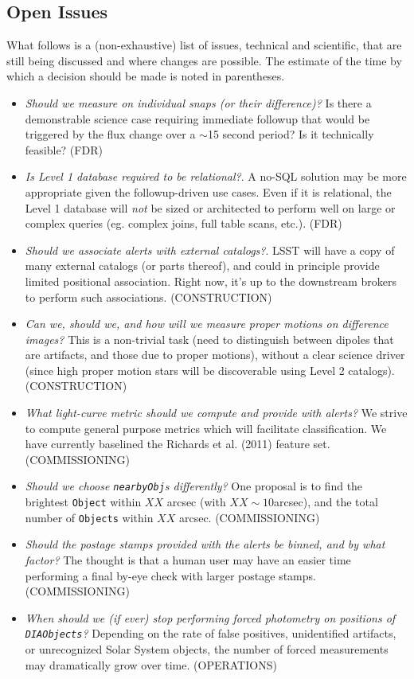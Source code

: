 \documentclass[12pt]{article}
\newcommand{\code}[1]{\texttt{#1}}
\newcommand{\DIAObjects}{\code{DIAObjects}\xspace}
\newcommand{\DB}{{Level 1 database}\xspace}
\newcommand{\Object}{\code{Object}\xspace}
\newcommand{\Objects}{\code{Objects}\xspace}
\begin{document}
\begin{openissues}
\subsection{Open Issues}

What follows is a (non-exhaustive) list of issues, technical and scientific, that are still being discussed and where changes are possible. The estimate of the time by which a decision should be made is noted in parentheses.

\begin{itemize}
    \item {\em Should we measure on individual snaps (or their difference)?} Is there a demonstrable science case requiring immediate followup that would be triggered by the flux change over a $\sim$15 second period? Is it technically feasible? (FDR)
    \item {\em Is \DB required to be relational?}. A no-SQL solution may be more appropriate given the followup-driven use cases. Even if it is relational, the Level 1 database will {\em not} be sized or architected to perform well on large or complex queries (eg. complex joins, full table scans, etc.). (FDR)
    \item {\em Should we associate alerts with external catalogs?}. LSST will have a copy of many external catalogs (or parts thereof), and could in principle provide limited positional association. Right now, it's up to the downstream brokers to perform such associations. (CONSTRUCTION)
    \item {\em Can we, should we, and how will we measure proper motions on difference images?} This is a non-trivial task (need to distinguish between dipoles that are artifacts, and those due to proper motions), without a clear science driver (since high proper motion stars will be discoverable using Level 2 catalogs). (CONSTRUCTION)
    \item {\em What light-curve metric should we compute and provide with alerts?} We strive to compute general purpose metrics which will facilitate classification. We have currently baselined the Richards et al. (2011) feature set. (COMMISSIONING)
    \item {\em Should we choose {\tt nearbyObj}s differently?} One proposal is to find the brightest \Object within $XX$ arcsec (with $XX \sim 10$arcsec), and the total number of \Objects within $XX$ arcsec. (COMMISSIONING)
    \item {\em Should the postage stamps provided with the alerts be binned, and by what factor?} The thought is that a human user may have an easier time performing a final by-eye check with larger postage stamps. (COMMISSIONING)
    \item {\em When should we (if ever) stop performing forced photometry on positions of \DIAObjects?} Depending on the rate of false positives, unidentified artifacts, or unrecognized Solar System objects, the number of forced measurements may dramatically grow over time. (OPERATIONS)

\end{itemize}
\end{openissues}
\end{document}
